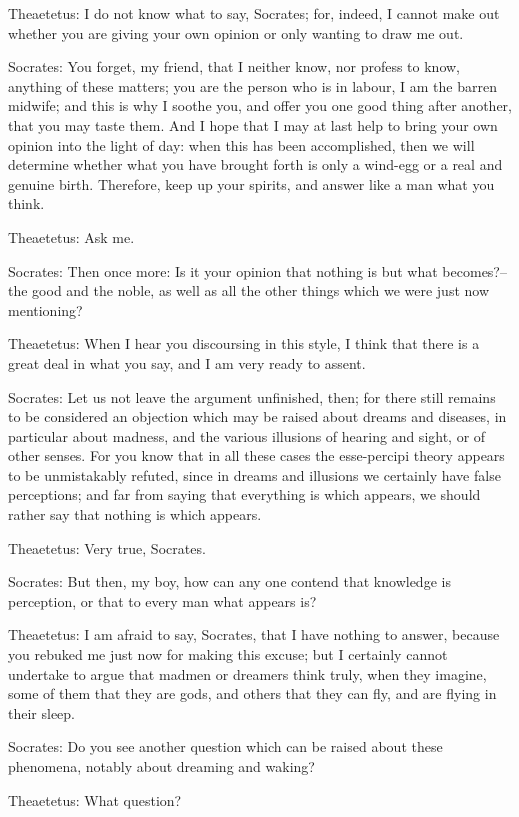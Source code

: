 Theaetetus: I do not know what to say, Socrates; for, indeed, I cannot
make out whether you are giving your own opinion or only wanting to draw
me out.

Socrates: You forget, my friend, that I neither know, nor profess to
know, anything of these matters; you are the person who is in labour, I
am the barren midwife; and this is why I soothe you, and offer you one
good thing after another, that you may taste them. And I hope that I may
at last help to bring your own opinion into the light of day: when this
has been accomplished, then we will determine whether what you have
brought forth is only a wind-egg or a real and genuine birth. Therefore,
keep up your spirits, and answer like a man what you think.

Theaetetus: Ask me.

Socrates: Then once more: Is it your opinion that nothing is but what
becomes?--the good and the noble, as well as all the other things which
we were just now mentioning?

Theaetetus: When I hear you discoursing in this style, I think that
there is a great deal in what you say, and I am very ready to assent.

Socrates: Let us not leave the argument unfinished, then; for there
still remains to be considered an objection which may be raised about
dreams and diseases, in particular about madness, and the various
illusions of hearing and sight, or of other senses. For you know that
in all these cases the esse-percipi theory appears to be unmistakably
refuted, since in dreams and illusions we certainly have false
perceptions; and far from saying that everything is which appears, we
should rather say that nothing is which appears.

Theaetetus: Very true, Socrates.

Socrates: But then, my boy, how can any one contend that knowledge is
perception, or that to every man what appears is?

Theaetetus: I am afraid to say, Socrates, that I have nothing to answer,
because you rebuked me just now for making this excuse; but I certainly
cannot undertake to argue that madmen or dreamers think truly, when they
imagine, some of them that they are gods, and others that they can fly,
and are flying in their sleep.

Socrates: Do you see another question which can be raised about these
phenomena, notably about dreaming and waking?

Theaetetus: What question?


